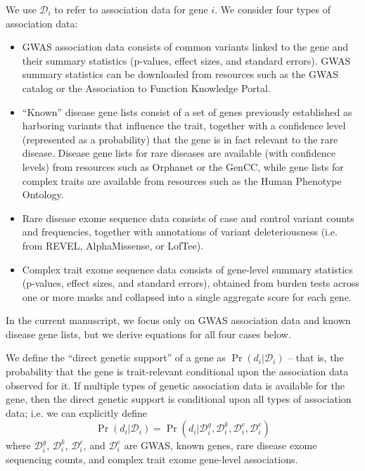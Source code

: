 \documentclass[11pt]{article}
\begin{document}
We use $\mathcal{D}_i$ to refer to association data for gene
$i$. We consider four types of association data:
\begin{itemize}
  \item GWAS association data consists of common variants linked to
    the gene and their summary statistics (p-values, effect sizes, and
    standard errors). GWAS summary statistics can be downloaded from
    resources such as the GWAS catalog\cite{} or the Association to Function
    Knowledge Portal\cite{}.
  \item ``Known'' disease gene lists consist of a set of genes previously
    established as harboring variants that influence the trait, together with a confidence level (represented as a
    probability) that the gene is in fact relevant to the rare
    disease. Disease gene lists for rare diseases are available (with confidence
    levels) from resources such as Orphanet\cite{} or the GenCC\cite{}, while gene
    lists for complex traits are available from resources such as
    the Human Phenotype Ontology\cite{}.
  \item Rare disease exome sequence data consists of case and control
    variant counts and frequencies, together with annotations of
    variant deleteriousness (i.e. from REVEL\cite{},
    AlphaMissense\cite{}, or LofTee\cite{}). 
  \item Complex trait exome sequence data consists of gene-level
    summary statistics (p-values, effect sizes, and standard errors),
    obtained from burden tests across one or more masks and collapsed
    into a single aggregate score for each gene.
\end{itemize}
In the current manuscript, we focus only on GWAS association data and
known disease gene lists, but we derive equations for all four cases below.

We define the ``direct genetic support'' of a gene as
$\Pr\left(d_i|\mathcal{D}_i\right)$ -- that is, the probability that
the gene is trait-relevant conditional upon the association data
observed for it. If multiple types of genetic association data is
available for the gene, then the direct genetic support is conditional
upon all types of association data; i.e. we can explicitly define
\[\Pr\left(d_i|\mathcal{D}_i\right) =
\Pr\left(d_i|\mathcal{D}^g_i,\mathcal{D}^k_i,\mathcal{D}^c_i,\mathcal{D}^e_i\right)\]
where $\mathcal{D}^g_i$, $\mathcal{D}^k_i$, $\mathcal{D}^c_i$, and
$\mathcal{D}^e_i$ are GWAS, known genes, rare disease exome sequencing counts, and
complex trait exome gene-level associations.
\end{document}
